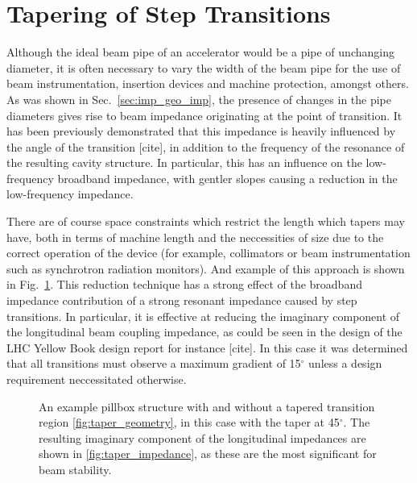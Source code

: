 \section{Tapering of Step Transitions}
\label{sec:step_ins}

Although the ideal beam pipe of an accelerator would be a pipe of unchanging diameter, it is often necessary to vary the width of the beam pipe for the use of beam instrumentation, insertion devices and machine protection, amongst others. As was shown in Sec.~\ref{sec:imp_geo_imp}, the presence of changes in the pipe diameters gives rise to beam impedance originating at the point of transition. It has been previously demonstrated that this impedance is heavily influenced by the angle of the transition [cite], in addition to the frequency of the resonance of the resulting cavity structure. In particular, this has an influence on the low-frequency broadband impedance, with gentler slopes causing a reduction in the low-frequency impedance. 

There are of course space constraints which restrict the length which tapers may have, both in terms of machine length and the neccessities of size due to the correct operation of the device (for example, collimators or beam instrumentation such as synchrotron radiation monitors). And example of this approach is shown in Fig.~\ref{fig:taper_ex}. This reduction technique has a strong effect of the broadband impedance contribution of a strong resonant impedance caused by step transitions. In particular, it is effective at reducing the imaginary component of the longitudinal beam coupling impedance, as could be seen in the design of the LHC Yellow Book design report for instance [cite]. In this case it was determined that all transitions must observe a maximum gradient of 15$^{\circ}$ unless a design requirement neccessitated otherwise.

\begin{figure}
\subfigure[]{

\label{fig:taper_geometry}
}
\subfigure[]{

\label{fig:taper_impedance}
}

\label{fig:taper_ex}
\caption{An example pillbox structure with and without a tapered transition region \ref{fig:taper_geometry}, in this case with the taper at 45$^{\circ}$. The resulting imaginary component of the longitudinal impedances are shown in \ref{fig:taper_impedance}, as these are the most significant for beam stability.}
\end{figure}

